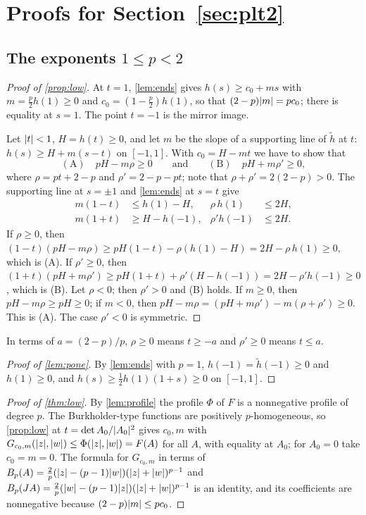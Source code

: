\section{Proofs for Section~\ref{sec:plt2}}\label{app:plt2}

\subsection{The exponents \texorpdfstring{$1\le p<2$}{1 <= p < 2}}

\begin{proof}[Proof of \cref{prop:low}]
At $t=1$, \cref{lem:ends} gives $h(s)\ge c_0+ms$ with $m=\tfrac p2h(1)\ge0$ and
$c_0=(1-\tfrac p2)h(1)$, so that $(2-p)\lvert m\rvert=pc_0$; there is equality at $s=1$. The point
$t=-1$ is the mirror image.

Let $\lvert t\rvert<1$, $H=h(t)\ge0$, and let $m$ be the slope of a supporting line of $\tilde h$ at
$t$: $h(s)\ge H+m(s-t)$ on $[-1,1]$. With $c_0=H-mt$ we have to show that
\[
  \mathrm{(A)}\quad pH-m\rho\ge0\qquad\text{and}\qquad\mathrm{(B)}\quad pH+m\rho'\ge0,
\]
where $\rho=pt+2-p$ and $\rho'=2-p-pt$; note that $\rho+\rho'=2(2-p)>0$. The supporting line
at $s=\pm1$ and \cref{lem:ends} at $s=t$ give
\begin{align*}
  m(1-t)&\le h(1)-H,& \rho\,h(1)&\le2H,\\
  m(1+t)&\ge H-h(-1),& \rho'h(-1)&\le2H .
\end{align*}
If $\rho\ge0$, then $(1-t)(pH-m\rho)\ge pH(1-t)-\rho(h(1)-H)=2H-\rho\,h(1)\ge0$, which is
(A). If $\rho'\ge0$, then $(1+t)(pH+m\rho')\ge pH(1+t)+\rho'(H-h(-1))=2H-\rho'h(-1)\ge0$,
which is (B). Let $\rho<0$; then $\rho'>0$ and (B) holds. If $m\ge0$, then
$pH-m\rho\ge pH\ge0$; if $m<0$, then $pH-m\rho=(pH+m\rho')-m(\rho+\rho')\ge0$. This is (A).
The case $\rho'<0$ is symmetric.
\end{proof}

In terms of $a=(2-p)/p$, $\rho\ge0$ means $t\ge-a$ and $\rho'\ge0$ means $t\le a$.

\begin{proof}[Proof of \cref{lem:pone}]
By \cref{lem:ends} with $p=1$, $h(-1)=\tilde h(-1)\ge0$ and $h(1)\ge0$, and
$h(s)\ge\tfrac12h(1)(1+s)\ge0$ on $[-1,1]$.
\end{proof}

\begin{proof}[Proof of \cref{thm:low}]
By \cref{lem:profile} the profile $\Phi$ of $F$ is a nonnegative profile of degree $p$.
The Burkholder-type functions are positively $p$-homogeneous, so
\cref{prop:low} at $t=\det A_0/\lvert A_0\rvert^2$ gives $c_0,m$ with
$G_{c_0,m}(\lvert z\rvert,\lvert w\rvert)\le\Phi(\lvert z\rvert,\lvert w\rvert)=F(A)$ for all $A$, with equality at $A_0$; for
$A_0=0$ take $c_0=m=0$. The formula for $G_{c_0,m}$ in terms of
$B_p(A)=\tfrac2p(\lvert z\rvert-(p-1)\lvert w\rvert)(\lvert z\rvert+\lvert w\rvert)^{p-1}$ and
$B_p(JA)=\tfrac2p(\lvert w\rvert-(p-1)\lvert z\rvert)(\lvert z\rvert+\lvert w\rvert)^{p-1}$ is an identity, and its coefficients
are nonnegative because $(2-p)\lvert m\rvert\le pc_0$.
\end{proof}

